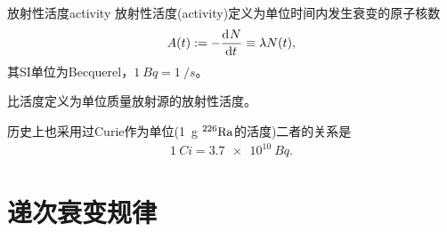 \begin{definition}{放射性活度}{activity}
	放射性活度(activity)定义为单位时间内发生衰变的原子核数
	\begin{equation}
		A(t):=-\frac{\mathrm{d}^{{}}N}{\mathrm{d}{t}^{{}}}\equiv\lambda N(t),
	\end{equation}
	其SI单位为Becquerel，$\SI{1}{Bq}=\SI{1}{\per s}$。
	
	比活度定义为单位质量放射源的放射性活度。
\end{definition}

\begin{remark}
	历史上也采用过Curie作为单位(\SI{1}{g} ${^{226}\mathrm{Ra}}$的活度)二者的关系是
	\begin{align}
		\SI{1}{Ci}=\SI{3.7e10}{Bq}.
	\end{align}
\end{remark}



\section{递次衰变规律}

